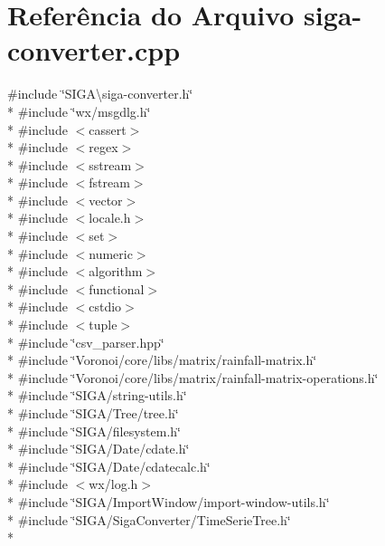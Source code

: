 \section{Referência do Arquivo siga-\/converter.cpp}
\label{siga-converter_8cpp}
{\ttfamily \#include \char`\"{}S\+I\+G\+A\textbackslash{}siga-\/converter.\+h\char`\"{}}\\*
{\ttfamily \#include \char`\"{}wx/msgdlg.\+h\char`\"{}}\\*
{\ttfamily \#include $<$cassert$>$}\\*
{\ttfamily \#include $<$regex$>$}\\*
{\ttfamily \#include $<$sstream$>$}\\*
{\ttfamily \#include $<$fstream$>$}\\*
{\ttfamily \#include $<$vector$>$}\\*
{\ttfamily \#include $<$locale.\+h$>$}\\*
{\ttfamily \#include $<$set$>$}\\*
{\ttfamily \#include $<$numeric$>$}\\*
{\ttfamily \#include $<$algorithm$>$}\\*
{\ttfamily \#include $<$functional$>$}\\*
{\ttfamily \#include $<$cstdio$>$}\\*
{\ttfamily \#include $<$tuple$>$}\\*
{\ttfamily \#include \char`\"{}csv\+\_\+parser.\+hpp\char`\"{}}\\*
{\ttfamily \#include \char`\"{}Voronoi/core/libs/matrix/rainfall-\/matrix.\+h\char`\"{}}\\*
{\ttfamily \#include \char`\"{}Voronoi/core/libs/matrix/rainfall-\/matrix-\/operations.\+h\char`\"{}}\\*
{\ttfamily \#include \char`\"{}S\+I\+G\+A/string-\/utils.\+h\char`\"{}}\\*
{\ttfamily \#include \char`\"{}S\+I\+G\+A/\+Tree/tree.\+h\char`\"{}}\\*
{\ttfamily \#include \char`\"{}S\+I\+G\+A/filesystem.\+h\char`\"{}}\\*
{\ttfamily \#include \char`\"{}S\+I\+G\+A/\+Date/cdate.\+h\char`\"{}}\\*
{\ttfamily \#include \char`\"{}S\+I\+G\+A/\+Date/cdatecalc.\+h\char`\"{}}\\*
{\ttfamily \#include $<$wx/log.\+h$>$}\\*
{\ttfamily \#include \char`\"{}S\+I\+G\+A/\+Import\+Window/import-\/window-\/utils.\+h\char`\"{}}\\*
{\ttfamily \#include \char`\"{}S\+I\+G\+A/\+Siga\+Converter/\+Time\+Serie\+Tree.\+h\char`\"{}}\\*
